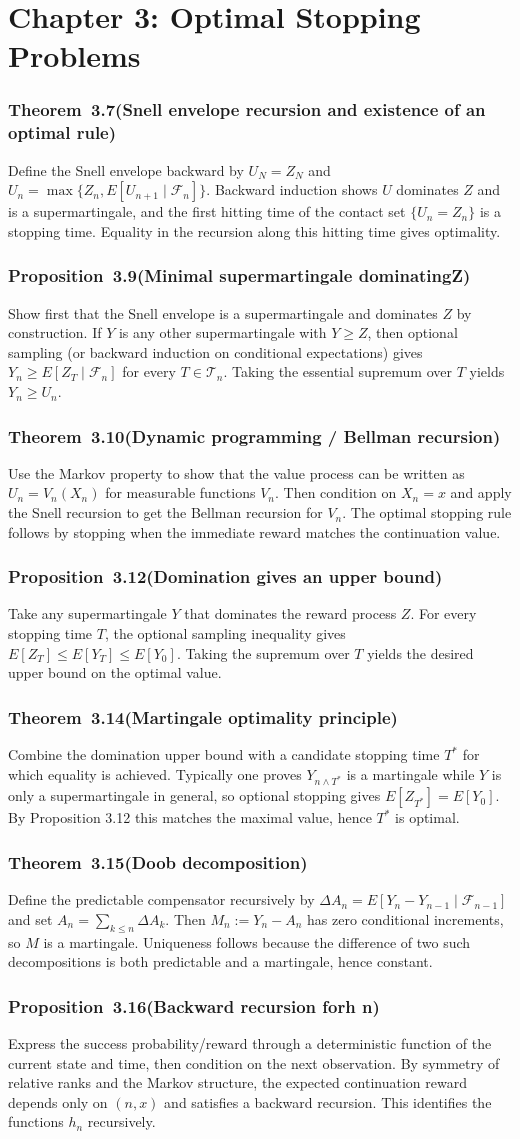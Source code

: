 \documentclass[11pt,a4paper]{article}
\newcommand{\proofcapsule}[4]{%
  \subsubsection*{#1~#2\quad \textnormal{\small(#3)}}%
  #4}
\begin{document}
\section{Chapter 3: Optimal Stopping Problems}
\proofcapsule{Theorem}{3.7}{Snell envelope recursion and existence of an optimal rule}{Define the Snell envelope backward by $U_N=Z_N$ and $U_n=\max\{Z_n,E[U_{n+1}\mid\mathcal F_n]\}$. Backward induction shows $U$ dominates $Z$ and is a supermartingale, and the first hitting time of the contact set $\{U_n=Z_n\}$ is a stopping time. Equality in the recursion along this hitting time gives optimality.}
\proofcapsule{Proposition}{3.9}{Minimal supermartingale dominatingZ}{Show first that the Snell envelope is a supermartingale and dominates $Z$ by construction. If $Y$ is any other supermartingale with $Y\ge Z$, then optional sampling (or backward induction on conditional expectations) gives $Y_n\ge E[Z_T\mid\mathcal F_n]$ for every $T\in\mathcal T_n$. Taking the essential supremum over $T$ yields $Y_n\ge U_n$.}
\proofcapsule{Theorem}{3.10}{Dynamic programming / Bellman recursion}{Use the Markov property to show that the value process can be written as $U_n=V_n(X_n)$ for measurable functions $V_n$. Then condition on $X_n=x$ and apply the Snell recursion to get the Bellman recursion for $V_n$. The optimal stopping rule follows by stopping when the immediate reward matches the continuation value.}
\proofcapsule{Proposition}{3.12}{Domination gives an upper bound}{Take any supermartingale $Y$ that dominates the reward process $Z$. For every stopping time $T$, the optional sampling inequality gives $E[Z_T]\le E[Y_T]\le E[Y_0]$. Taking the supremum over $T$ yields the desired upper bound on the optimal value.}
\proofcapsule{Theorem}{3.14}{Martingale optimality principle}{Combine the domination upper bound with a candidate stopping time $T^*$ for which equality is achieved. Typically one proves $Y_{n\wedge T^*}$ is a martingale while $Y$ is only a supermartingale in general, so optional stopping gives $E[Z_{T^*}]=E[Y_0]$. By Proposition 3.12 this matches the maximal value, hence $T^*$ is optimal.}
\proofcapsule{Theorem}{3.15}{Doob decomposition}{Define the predictable compensator recursively by $\Delta A_n=E[Y_n-Y_{n-1}\mid\mathcal F_{n-1}]$ and set $A_n=\sum_{k\le n}\Delta A_k$. Then $M_n:=Y_n-A_n$ has zero conditional increments, so $M$ is a martingale. Uniqueness follows because the difference of two such decompositions is both predictable and a martingale, hence constant.}
\proofcapsule{Proposition}{3.16}{Backward recursion forh n}{Express the success probability/reward through a deterministic function of the current state and time, then condition on the next observation. By symmetry of relative ranks and the Markov structure, the expected continuation reward depends only on $(n,x)$ and satisfies a backward recursion. This identifies the functions $h_n$ recursively.}
\end{document}
